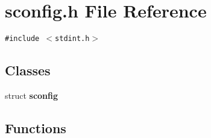 \section{sconfig.h File Reference}
\label{sconfig_8h}
{\tt \#include $<$stdint.h$>$}\par
\subsection*{Classes}
\begin{CompactItemize}
\item 
struct {\bf sconfig}
\end{CompactItemize}
\subsection*{Functions}
